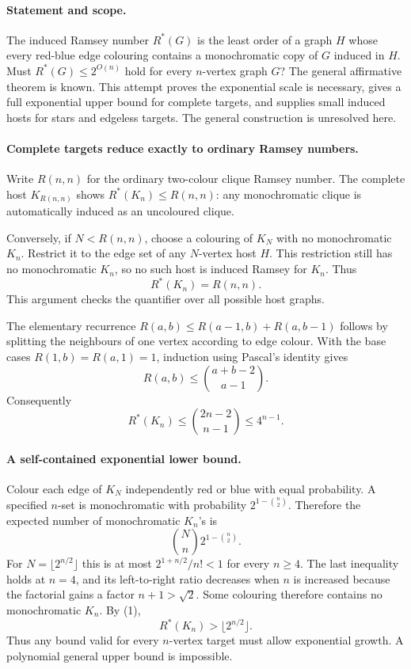 \paragraph{Statement and scope.}
The induced Ramsey number \(R^*(G)\) is the least order of a graph
\(H\) whose every red-blue edge colouring contains a monochromatic
copy of \(G\) induced in \(H\). Must \(R^*(G)\leq2^{O(n)}\)
hold for every \(n\)-vertex graph \(G\)?
The general affirmative theorem is known. This attempt proves the
exponential scale is necessary, gives a full exponential upper bound
for complete targets, and supplies small induced hosts for stars and
edgeless targets. The general construction is unresolved here.

\paragraph{Complete targets reduce exactly to ordinary Ramsey numbers.}
Write \(R(n,n)\) for the ordinary two-colour clique Ramsey number.
The complete host \(K_{R(n,n)}\) shows
\(R^*(K_n)\leq R(n,n)\): any monochromatic clique is automatically
induced as an uncoloured clique.

Conversely, if \(N<R(n,n)\), choose a colouring of \(K_N\) with
no monochromatic \(K_n\). Restrict it to the edge set of any
\(N\)-vertex host \(H\). This restriction still has no monochromatic
\(K_n\), so no such host is induced Ramsey for \(K_n\). Thus
\[
 R^*(K_n)=R(n,n). \tag{1}
\]
This argument checks the quantifier over all possible host graphs.

The elementary recurrence
\(R(a,b)\leq R(a-1,b)+R(a,b-1)\) follows by splitting the
neighbours of one vertex according to edge colour.
With the base cases \(R(1,b)=R(a,1)=1\), induction using Pascal's
identity gives
\[
 R(a,b)\leq\binom{a+b-2}{a-1}.
\]
Consequently
\[
 R^*(K_n)\leq\binom{2n-2}{n-1}\leq4^{n-1}. \tag{2}
\]

\paragraph{A self-contained exponential lower bound.}
Colour each edge of \(K_N\) independently red or blue with equal
probability. A specified \(n\)-set is monochromatic with probability
\(2^{1-\binom n2}\). Therefore the expected number of monochromatic
\(K_n\)'s is
\[
 \binom Nn2^{1-\binom n2}.
\]
For \(N=\lfloor2^{n/2}\rfloor\) this is at most
\(2^{1+n/2}/n!<1\) for every \(n\geq4\).
The last inequality holds at \(n=4\), and its left-to-right ratio
decreases when \(n\) is increased because the factorial gains a
factor \(n+1>\sqrt2\).
Some colouring therefore contains no monochromatic \(K_n\).
By (1),
\[
 R^*(K_n)>\lfloor2^{n/2}\rfloor. \tag{3}
\]
Thus any bound valid for every \(n\)-vertex target must allow
exponential growth. A polynomial general upper bound is impossible.

